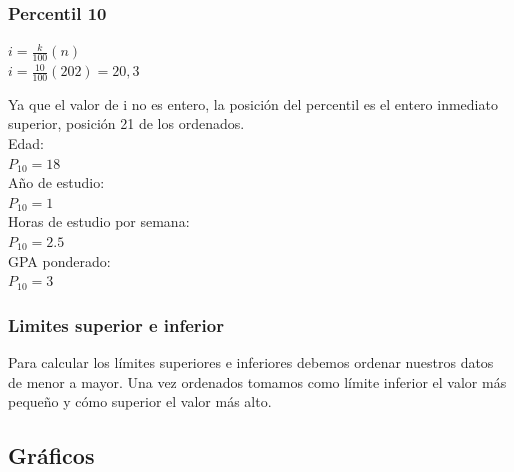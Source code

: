 \documentclass{article}
\begin{document}
\subsubsection*{Percentil 10}
\begin{center}
$i = \frac{k}{100}(n)$\\
$i = \frac{10}{100}(202) = 20,3$\\
\end{center}
Ya que el valor de i no es entero, la posición del percentil es el entero inmediato superior, posición 21 de los ordenados.\vspace{0.25cm}\\
Edad:\\                                          $P_{10}= 18$\vspace{0.25cm}\\
Año de estudio: \\                          $P_{10}= 1$\vspace{0.25cm}\\
Horas de estudio por semana:\\    $P_{10}= 2.5$\vspace{0.25cm}\\
GPA ponderado:\\                          $P_{10}= 3$\vspace{0.25cm}\\
\subsubsection*{Limites superior e inferior}
Para calcular los límites superiores e inferiores debemos ordenar nuestros datos de menor a mayor. Una vez ordenados tomamos como límite inferior el valor más pequeño y cómo superior el valor más alto.\vspace{0.25cm}\\

\subsection*{Gráficos}
\end{document}
